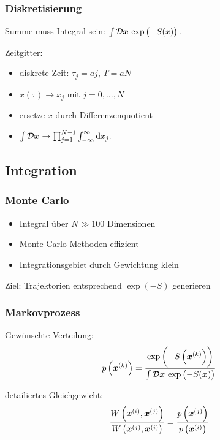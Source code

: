 \documentclass[ngerman, fleqn]{beamer}
\newcommand\timesites{N}
\newcommand\funcmeasure{\mathcal D \vec x}
\begin{document}
\begin{frame}
    \frametitle{Diskretisierung}

    Summe muss Integral sein:
    \(
        \int \funcmeasure \, \exp\del{-S(x)}.
    \)

    Zeitgitter:
    \begin{itemize}
        \item
            diskrete Zeit: $\tau_j = a j$, $T = aN$
        \item
            $x(\tau) \to x_j$ mit $j = 0, \ldots, N$
        \item
            ersetze $\dot x$ durch Differenzenquotient
        \item
            \(
            \int \funcmeasure
            \to
            \prod_{j = 1}^{\timesites-1} \int_{-\infty}^\infty \dif x_j.
            \)
    \end{itemize}

\end{frame}

\subsection{Integration}

\begin{frame}
    \frametitle{Monte Carlo}

    \begin{itemize}
        \item 
            Integral über $N \gg 100$ Dimensionen
        \item
            Monte-Carlo-Methoden effizient
        \item
            Integrationsgebiet durch Gewichtung klein
    \end{itemize}

    Ziel: Trajektorien entsprechend $\exp(-S)$ generieren
\end{frame}

\begin{frame}
    \frametitle{Markovprozess}

    Gewünschte Verteilung:
    \[
        p\del{\vec x^{(k)}} = \frac{\exp\del{-S\del{\vec x^{(k)}}}}{\int
            \funcmeasure
        \, \exp\del{-S(\vec x)}}
    \]

    detailiertes Gleichgewicht:
    \[
        \frac{W\del{\vec x^{(i)}, \vec x^{(j)}}}{W\del{\vec x^{(j)}, \vec x^{(i)}}}
        = \frac{p\del{\vec x^{(j)}}}{p\del{\vec x^{(i)}}}
    \]
\end{frame}
\end{document}

